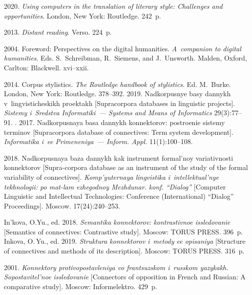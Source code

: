 \begin{multicols}{2}
{{\begin{thebibliography}{99}
     2020. \textit{Using computers in the translation 
of literary style: Challenges and opportunities}. London, New York: 
Routledge. 242~p.

     2013. \textit{Distant reading}. 
Verso. 224~p.

     2004. Foreword: Perspectives on the digital 
humanities. \textit{A~companion to digital humanities}. Eds. 
S.~Schreibman, R.~Siemens, and J.~Unsworth. Malden, Oxford, 
Carlton: Blackwell. xvi--xxii.

     2014. Corpus stylistics. \textit{The Routledge 
handbook of stylistics}. Ed. M.~Burke. London, New York: Routledge.  
378--392.
2019. Nadkorpusnye basy dannykh v~lingvisticheskikh proektakh 
[Supracorpora databases in linguistic projects]. \textit{Sistemy 
i~Sredstva Informatiki~--- Systems and Means of Informatics} 
 29(3):77--91.
    . 
2017. Nadkorpusnaya basa dannykh konnektorov: postroenie sistemy 
terminov [Supracorpora database of connectives: Term system 
development]. \textit{Informatika i~ee Primeneniya~--- Inform. Appl.} 
11(1):100--108.

     2018. Nadkorpusnaya baza dannykh kak 
instrument formal'noy variativnosti konnektorov [Supra-corpora 
database as an instrument of the study of the formal variability of 
connectives]. \textit{Komp'yuternaya ling\-vi\-sti\-ka i~intellektual'nye 
tekhnologii: po mat-lam ezhegodnoy Mezhdunar. konf. ``Dialog''} 
[Computer Linguistic and Intellectual Technologies: Conference 
(International) ``Dialog'' Proceedings]. Moscow. 17(24):240--253.


    In'kova, O.Yu., ed. 2018. \textit{Semantika konnektorov: 
kontrastivnoe issledovanie} [Semantics of connectives: Contrastive 
study]. Moscow: TORUS PRESS. 396~p.
    Inkova, O.\,Yu., ed. 2019. \textit{Struktura konnektorov i~metody 
ee opisaniya} [Structure of connectives and methods of its description]. 
Moscow: TORUS PRESS. 316~p.

     2001. \textit{Konnektory 
pro\-ti\-vo\-po\-stav\-le\-niya vo frantsuzskom i~russkom yazykakh. 
So\-po\-sta\-vi\-tel'\-noe issledovanie} [Connectors of opposition in French and 
Russian: A comparative study]. Moscow: Informelektro. 429~p.


\end{thebibliography}}}
\end{multicols}

